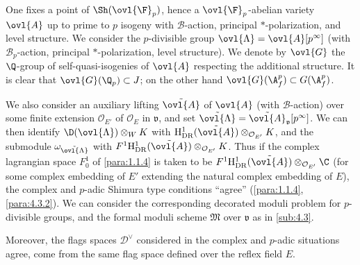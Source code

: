 \begin{para}\label{para:7.2.1}
 One fixes a point of $\Sh(\ovl{\F}_p)$, hence a
 $\ovl{\F}_p$-abelian variety $\ovl{A}$ up to prime to $p$ isogeny with
 $\mathcal{B}$-action, principal $\ast$-polarization, and level
 structure. We consider the $p$-divisible group
 $\ovl{\Lambda}={\ovl{A}}[p^\infty]$ (with $\mathcal{B}_p$-action,
 principal 
 $\ast$-polarization, level structure). We denote by $\ovl{G}$ the
 $\Q$-group of self-quasi-isogenies of ${\ovl{A}}$ respecting the
 additional structure. It is clear that $\ovl{G}(\Q_p)\subset J$; on the
 other hand $\ovl{G}(\A_f^p)\subset G(\A_f^p)$.

 We also consider an auxiliary lifting $\tilde{\ovl{A}}$ of $\ovl{A}$ (with
 $\mathcal{B}$-action) over some finite extension $\mathcal{O}_{E'}$ of
 $\mathcal{O}_E$ in $\mathfrak{v}$, and set
 $\tilde{\ovl{\Lambda}}=\tilde{\ovl{A}}_\mathfrak{v}[p^\infty]$.  We can
 then identify $\D(\ovl{\Lambda})\otimes_W K$ with
 $\mathrm{H}^1_{\mathrm{DR}}(\tilde{\ovl{A}})\otimes_{\mathcal{O}_{E'}}
 K$, and the submodule $\omega_{\tilde{\ovl{\Lambda}}}$ with
 $F^1\mathrm{H}^1_{\mathrm{DR}}(\tilde{\ovl{A}})\otimes_{\mathcal{O}_{E'}}
 K$.  Thus if the complex lagrangian space 
 $F^1_0$ of \ref{para:1.1.4} is taken to be
 $F^1\mathrm{H}^1_{\mathrm{DR}}(\tilde{\ovl{A}})\otimes_{\mathcal{O}_{E'}}
 \C$ (for some complex embedding of $E'$ 
 extending the natural complex embedding of $E$), the complex and
 $p$-adic Shimura type conditions ``agree'' (\ref{para:1.1.4}, \ref{para:4.3.2}). We can
 consider the corresponding decorated moduli problem for $p$-divisible
 groups, and the formal moduli scheme $\mathfrak{M}$ over $\mathfrak{v}$
 as in \ref{sub:4.3}.
 

 \noindent Moreover, the flags spaces $\mathcal{D}^\vee$ considered in 
 the complex and $p$-adic situations agree, \ie come from the same flag 
 space defined over the reflex field $E$.


\end{para}

